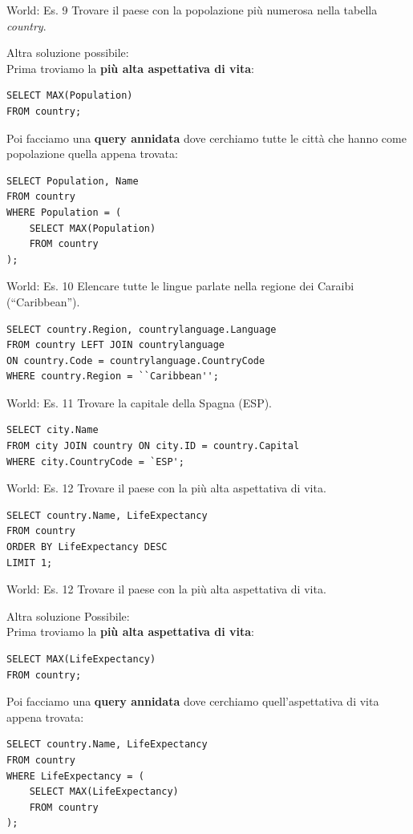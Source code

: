%
\begin{frame}[fragile]{World: Es. 9}
Trovare il paese con la popolazione pi\`u numerosa nella tabella \textit{country}.

Altra soluzione possibile:
\pause
\\Prima troviamo la \textbf{pi\`u alta aspettativa di vita}:
\begin{lstlisting}
SELECT MAX(Population)
FROM country;
\end{lstlisting}
\pause
Poi facciamo una \textbf{query annidata} dove cerchiamo tutte le citt\`a che hanno come popolazione quella appena trovata:
\begin{lstlisting}
SELECT Population, Name
FROM country
WHERE Population = (
    SELECT MAX(Population)
    FROM country
);
\end{lstlisting}
\end{frame}
%
\begin{frame}[fragile]{World: Es. 10}
Elencare tutte le lingue parlate nella regione dei Caraibi (``Caribbean''). 
\pause
\begin{lstlisting}
SELECT country.Region, countrylanguage.Language
FROM country LEFT JOIN countrylanguage
ON country.Code = countrylanguage.CountryCode
WHERE country.Region = ``Caribbean'';
\end{lstlisting}
\end{frame}
%
\begin{frame}[fragile]{World: Es. 11}
Trovare la capitale della Spagna (ESP).
\pause
\begin{lstlisting}
SELECT city.Name
FROM city JOIN country ON city.ID = country.Capital
WHERE city.CountryCode = `ESP';
\end{lstlisting}
\end{frame}
%
\begin{frame}[fragile]{World: Es. 12}
Trovare il paese con la pi\`u alta aspettativa di vita.
\pause
\begin{lstlisting}
SELECT country.Name, LifeExpectancy
FROM country
ORDER BY LifeExpectancy DESC
LIMIT 1;
\end{lstlisting}
\end{frame}
%
\begin{frame}[fragile]{World: Es. 12}
Trovare il paese con la pi\`u alta aspettativa di vita.

Altra soluzione Possibile:
\pause
\\Prima troviamo la \textbf{pi\`u alta aspettativa di vita}:
\begin{lstlisting}
SELECT MAX(LifeExpectancy)
FROM country;
\end{lstlisting}
\pause
Poi facciamo una \textbf{query annidata} dove cerchiamo quell'aspettativa di vita appena trovata:
\begin{lstlisting}
SELECT country.Name, LifeExpectancy
FROM country
WHERE LifeExpectancy = (
    SELECT MAX(LifeExpectancy)
    FROM country
);
\end{lstlisting}
\end{frame}
